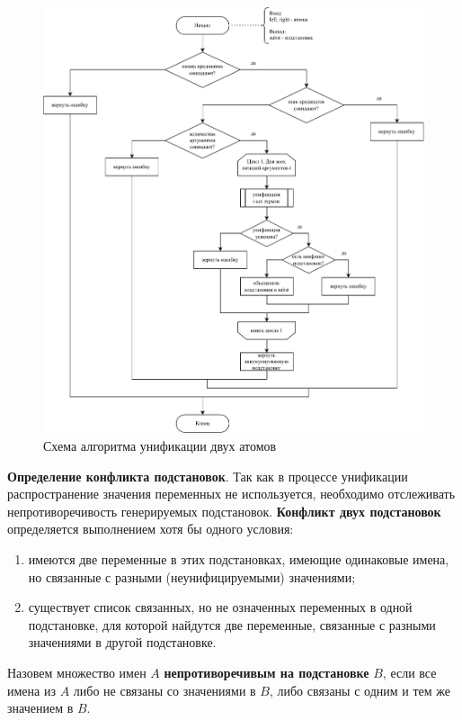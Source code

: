 \begin{figure}[h!]
    \includegraphics[width=\linewidth]{unify-atom.pdf}
    \caption{Схема алгоритма унификации двух атомов}
    \label{fig:unify-atom}
\end{figure}

\textbf{Определение конфликта подстановок}. Так как в процессе унификации распространение значения переменных не используется, необходимо отслеживать непротиворечивость генерируемых подстановок. \textbf{Конфликт двух подстановок} определяется выполнением хотя бы одного условия:

\begin{enumerate}
    \item имеются две переменные в этих подстановках, имеющие одинаковые имена, но связанные с разными (неунифицируемыми) значениями;
    \item существует список связанных, но не означенных переменных в одной подстановке, для которой найдутся две переменные, связанные с разными значениями в другой подстановке.
\end{enumerate}

Назовем множество имен $A$ \textbf{непротиворечивым на подстановке} $B$, если все имена из $A$ либо не связаны со значениями в $B$, либо связаны с одним и тем же значением в $B$.

